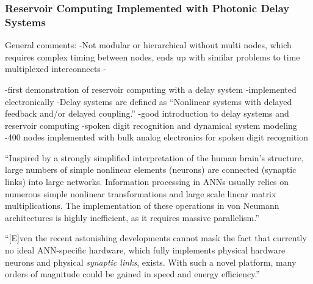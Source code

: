 \vspace{3em}
\cite{vabr2017}



\vspace{3em}
\cite{padu2012}

\vspace{3em}
\cite{dusc2012}


\vspace{3em}
\cite{vadi2008}

\vspace{3em}
\cite{anha2017}

\subsubsection{Reservoir Computing Implemented with Photonic Delay Systems}
General comments:
-Not modular or hierarchical without multi nodes, which requires complex timing between nodes, ends up with similar problems to time multiplexed interconnects
-

\vspace{3em}
\cite{apso2010}
-first demonstration of reservoir computing with a delay system
-implemented electronically
-Delay systems are defined as ``Nonlinear systems with delayed feedback and/or delayed coupling.''
-good introduction to delay systems and reservoir computing
-spoken digit recognition and dynamical system modeling
-400 nodes implemented with bulk analog electronics for spoken digit recognition

\vspace{3em}
\cite{brpe2018}
``Inspired by a strongly simplified interpretation of the human brain's structure, large numbers of simple nonlinear elements (neurons) are connected (synaptic links) into large networks. Information processing in ANNs usually relies on numerous simple nonlinear transformations and large scale linear matrix multiplications. The implementation of these operations in von Neumann architectures is highly inefficient, as it requires massive parallelism.''

``[E]ven the recent astonishing developments cannot mask the fact that currently no ideal ANN-specific hardware, which fully implements physical hardware neurons and physical \textit{synaptic links}, exists. With such a novel platform, many orders of magnitude could be gained in speed and energy efficiency.''

